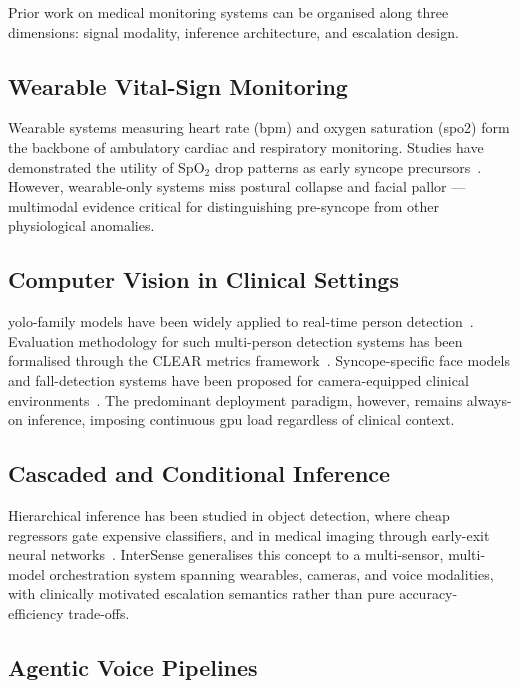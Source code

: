 \documentclass[10pt,twocolumn,a4paper]{article}
\begin{document}
Prior work on medical monitoring systems can be organised along three
dimensions: signal modality, inference architecture, and escalation
design.

\subsection{Wearable Vital-Sign Monitoring}

Wearable systems measuring heart rate (\gls{bpm}) and oxygen
saturation (\gls{spo2}) form the backbone of ambulatory cardiac and
respiratory monitoring.  Studies have demonstrated the utility of
SpO$_2$ drop patterns as early syncope precursors~\cite{mathias2013}.
However, wearable-only systems miss postural collapse and facial
pallor — multimodal evidence critical for distinguishing pre-syncope
from other physiological anomalies.

\subsection{Computer Vision in Clinical Settings}

\Gls{yolo}-family models have been widely applied to real-time person
detection~\cite{redmon2018yolov3}.  Evaluation methodology for such
multi-person detection systems has been formalised through the CLEAR
metrics framework~\cite{stiefelhagen2007}.  Syncope-specific face models and
fall-detection systems have been proposed for camera-equipped clinical
environments~\cite{wang2023yolo}.  The predominant deployment paradigm,
however, remains always-on inference, imposing continuous \gls{gpu}
load regardless of clinical context.

\subsection{Cascaded and Conditional Inference}

Hierarchical inference has been studied in object detection, where
cheap regressors gate expensive classifiers, and in medical imaging
through early-exit neural networks~\cite{teyssedre2022early}.
InterSense generalises this concept to a multi-sensor, multi-model
orchestration system spanning wearables, cameras, and voice modalities,
with clinically motivated escalation semantics rather than pure
accuracy-efficiency trade-offs.

\subsection{Agentic Voice Pipelines}
\end{document}
